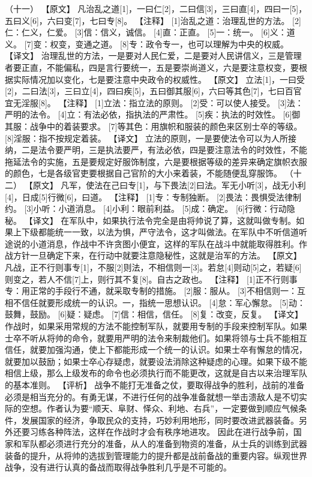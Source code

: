 \documentclass[a4paper,12pt,UTF8,twoside]{ctexbook}
\begin{document}
（十一）
【原文】
凡治乱之道[1]，一曰仁[2]，二曰信[3]，三曰直[4]，四曰一[5]，五曰义[6]，六曰变[7]，七曰专[8]。
【注释】
[1]治乱之道：治理乱世的方法。
[2]仁：仁义，仁爱。
[3]信：信义，诚信。
[4]直：正直。
[5]一：统一。
[6]义：道义。
[7]变：权变，变通之道。
[8]专：政令专一，也可以理解为中央的权威。
【译文】
治理乱世的方法，一是要对人民仁爱，二是要对人民讲信义，三是管理者要正直，不能偏私，四是言行要统一，五是要崇尚道义，六是要注意权变，要根据实际情况加以变化，七是要注意中央政令的权威性。
【原文】
立法[1]，一曰受[2]，二曰法[3]，三曰立[4]，四曰疾[5]，五曰御其服[6]，六曰等其色[7]，七曰百官宜无淫服[8]。
【注释】
[1]立法：指立法的原则。
[2]受：可以使人接受。
[3]法：严明的法令。
[4]立：有法必依，指执法的严肃性。
[5]疾：执法的时效性。
[6]御其服：战争中的着装要求。
[7]等其色：用旗帜和服装的颜色来区别士卒的等级。
[8]淫服：指不按规定着装。
【译文】
立法的原则，一是要使法令可以为人所接纳，二是法令要严明，三是执法要严，有法必依，四是要注意法令的时效性，不能拖延法令的实施，五是要规定好服饰制度，六是要根据等级的差异来确定旗帜衣服的颜色，七是各级官吏要根据自己官阶的大小来着装，不能随便乱穿服饰。
（十二）
【原文】
凡军，使法在己曰专[1]，与下畏法[2]曰法。军无小听[3]，战无小利[4]，日成[5]行微[6]，曰道。
【注释】
[1]专：专制独断。
[2]畏法：畏惧受法律制约。
[3]小听：小道消息。
[4]小利：眼前利益。
[5]成：确定。
[6]行微：行动隐秘。
【译文】
在军队中，如果执行法令完全是由将帅说了算，这就叫做专制。如果上下级都能统一一致，以法为惧，严守法令，这才叫做法。在军队中不听信道听途说的小道消息，作战中不许贪图小便宜，这样的军队在战斗中就能取得胜利。作战方针一旦确定下来，在行动中就要注意隐秘性，这就是治军的方法。
【原文】
凡战，正不行则事专[1]，不服[2]则法，不相信则一[3]。若怠[4]则动[5]之，若疑[6]则变之，若人不信[7]上，则行其不复[8]。自古之政也。
【注释】
[1]正不行则事专：用正常的手段行不通，就采取专制的措施。
[2]服：服从。
[3]不相信则一：互相不信任就要形成统一的认识。一，指统一思想认识。
[4]怠：军心懈怠。
[5]动：鼓舞，鼓励。
[6]疑：疑虑。
[7]信：相信，信任。
[8]复：改变，反复。
【译文】
作战时，如果采用常规的方法不能控制军队，就要用专制的手段来控制军队。如果士卒不听从将帅的命令，就要用严明的法令来制裁他们。如果将领与士兵不能相互信任，就要加强沟通，使上下都能形成一个统一的认识。如果士卒有懈怠的情况，就要加以鼓励；如果士卒心存疑虑，就要设法消除这种疑虑的心理。如果下级不能相信上级，那么上级发布的命令也必须执行而不能更改，这就是自古以来治理军队的基本准则。
【评析】
战争不能打无准备之仗，要取得战争的胜利，战前的准备必须是相当充分的。有勇无谋，不进行任何的战争准备就想一举击溃敌人是不切实际的空想。作者认为要“顺天、阜财、怿众、利地、右兵”，一定要做到顺应气候条件，发展国家的经济，争取民众的支持，巧妙利用地形，同时要改进武器装备。另外还要习练各种阵法，这样在作战时才会有秩序地进攻。
因此在进行战争前，国家和军队都必须进行充分的准备，从人的准备到物资的准备，从士兵的训练到武器装备的提升，从将帅的选拔到管理能力的提升都是战前备战的重要内容。纵观世界战争，没有进行认真的备战而取得战争胜利几乎是不可能的。
\end{document}
